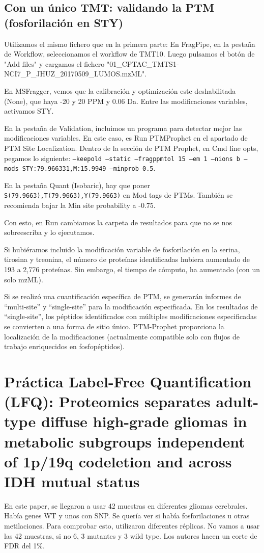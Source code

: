 \documentclass[nochap]{config/ejercicios}
\begin{document}
\subsection{Con un único TMT: validando la PTM (fosforilación en STY)}
Utilizamos el mismo fichero que en la primera parte: En FragPipe, en la pestaña de Workflow, seleccionamos el workflow de TMT10. Luego pulsamos el botón de "Add files" y cargamos el fichero "01\_CPTAC\_TMTS1-NCI7\_P\_JHUZ\_20170509\_LUMOS.mzML". 

En MSFragger, vemos que la calibración y optimización este deshabilitada (None), que haya -20 y 20 PPM y 0.06 Da. Entre las modificaciones variables, activamos STY. 

En la pestaña de Validation, incluimos un programa para detectar mejor las modificaciones variables. En este caso, es Run PTMProphet en el apartado de PTM Site Localization. Dentro de la sección de PTM Prophet, en Cmd line opts, pegamos lo siguiente: \texttt{--keepold --static --fragppmtol 15 --em 1 --nions b --mods STY:79.966331,M:15.9949 --minprob 0.5}.

En la pestaña Quant (Isobaric), hay que poner \texttt{S(79.9663),T(79.9663),Y(79.9663)} en Mod tags de PTMs. También se recomienda bajar la Min site probability a -0.75.

Con esto, en Run cambiamos la carpeta de resultados para que no se nos sobreescriba y lo ejecutamos. 

Si hubiéramos incluido la modificación variable de fosforilación en la serina, tirosina y treonina, el número de proteínas identificadas hubiera aumentado de 193 a 2,776 proteínas. Sin embargo, el tiempo de cómputo, ha aumentado (con un solo mzML).

Si se realizó una cuantificación específica de PTM, se generarán informes de “multi-site” y “single-site” para la modificación especificada. En los resultados de “single-site”, los péptidos identificados con múltiples modificaciones especificadas se convierten a una forma de sitio único.
PTM-Prophet proporciona la localización de la modificaciones (actualmente compatible solo con flujos de trabajo enriquecidos en fosfopéptidos).

\section{Práctica Label-Free Quantification (LFQ): Proteomics separates adult-type diffuse high-grade gliomas in metabolic subgroups independent of 1p/19q codeletion and across IDH mutual status}
En este paper, se llegaron a usar 42 muestras en diferentes gliomas cerebrales. Había genes WT y unos con SNP. Se quería ver si había fosforilaciones u otras metilaciones. Para comprobar esto, utilizaron diferentes réplicas. No vamos a usar las 42 muestras, si no 6, 3 mutantes y 3 wild type. 
Los autores hacen un corte de FDR del 1\%.
\end{document}
